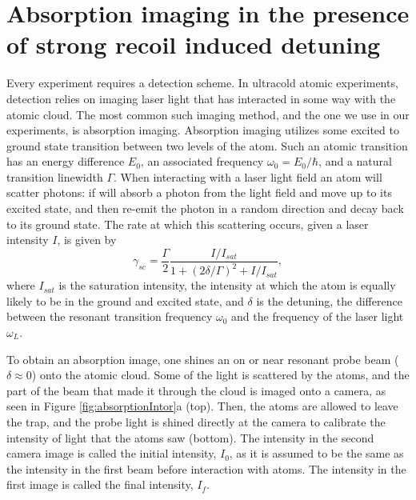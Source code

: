 \documentclass[12pt]{iopart}
\begin{document}
\section{Absorption imaging in the presence of strong recoil induced detuning}
Every experiment requires a detection scheme. In ultracold atomic experiments, detection relies on imaging laser light that has interacted in some way with the atomic cloud. The most common such imaging method, and the one we use in our experiments, is absorption imaging. Absorption imaging utilizes some excited to ground state transition between two levels of the atom. Such an atomic transition has an energy difference $E_0$, an associated frequency $\omega_0 = E_0/\hbar$, and a natural transition linewidth $\Gamma$. When interacting with a laser light field an atom will scatter photons: if will absorb a photon from the light field and move up to its excited state, and then re-emit the photon in a random direction and decay back to its ground state. The  rate at which this scattering occurs, given a laser intensity $I$, is given by
\begin{equation}
\gamma_{sc}= \frac{\Gamma}{2} \frac{I/I_{sat}}{1+(2\delta/\Gamma)^2 +I/I_{sat}}, 
\label{eq:scatrate}
\end{equation}
where $I_{sat}$ is the saturation intensity, the intensity at which the atom is equally likely to be in the ground and excited state, and $\delta$ is the detuning, the difference between the resonant transition frequency $\omega_0$ and the frequency of the laser light $\omega_L$.  
\par To obtain an absorption image, one shines an on or near resonant probe beam ($\delta\approx0$) onto the atomic cloud. Some of the light is scattered by the atoms, and the part of the beam that made it through the cloud is imaged onto a camera, as seen in Figure \ref{fig:absorptionIntor}a (top). Then, the atoms are allowed to leave the trap, and the probe light is shined directly at the camera to calibrate the intensity of light that the atoms saw (bottom). The intensity in the second camera image is called the initial intensity, $I_{0}$, as it is assumed to be the same as the intensity in the first beam before interaction with atoms. The intensity in the first image is called the final intensity, $I_f$.  
\end{document}
